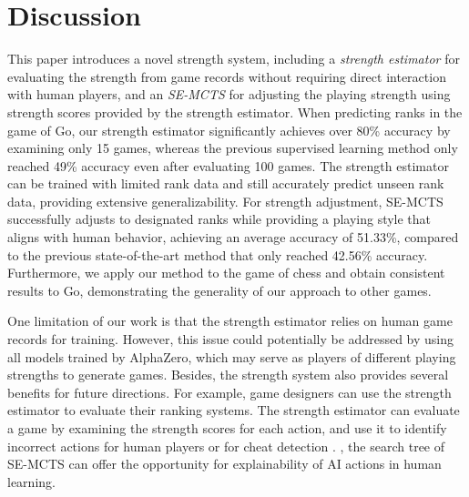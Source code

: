 \section{Discussion}
\label{sec:discussion}
This paper introduces a novel strength system, including a \textit{strength estimator} for evaluating the strength from game records without requiring direct interaction with human players, and an \textit{SE-MCTS} for adjusting the playing strength using strength scores provided by the strength estimator.
When predicting ranks in the game of Go, our strength estimator significantly achieves over 80\% accuracy by examining only 15 games, whereas the previous supervised learning method only reached 49\% accuracy even after evaluating 100 games.
The strength estimator can be trained with limited rank data and still accurately predict unseen rank data, providing extensive generalizability.
For strength adjustment, SE-MCTS successfully adjusts to designated ranks while providing a playing style that aligns with human behavior, achieving an average accuracy of 51.33\%, compared to the previous state-of-the-art method that only reached 42.56\% accuracy.
Furthermore, we apply our method to the game of chess and obtain consistent results to Go, demonstrating the generality of our approach to other games. 

One limitation of our work is that the strength estimator relies on human game records for training.
However, this issue could potentially be addressed by using all models trained by AlphaZero, which may serve as players of different playing strengths to generate games.
Besides, the strength system also provides several benefits for future directions.
For example, game designers can use the strength estimator to evaluate their ranking systems.
The strength estimator can evaluate a game by examining the strength scores for each action, and use it to identify incorrect actions for human players or for cheat detection \citep{alayed_behavioralbased_2013}.
, the search tree of SE-MCTS can offer the opportunity for explainability of AI actions in human learning.

